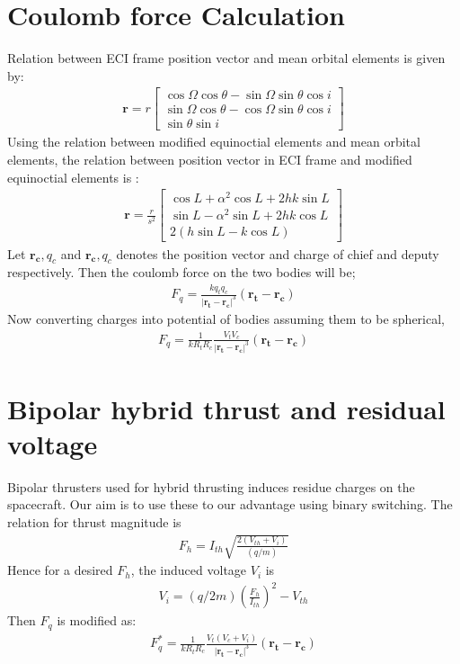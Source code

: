\documentclass[]{article}
\theoremstyle{remark}
\theoremstyle{definition}
\begin{document}
	\section{Coulomb force Calculation}
	Relation between ECI frame position vector and mean orbital elements is given by:
	\begin{align}
		\mathbf{r} = r\begin{bmatrix}
			\cos{\Omega}\cos{\theta}-\sin{\Omega}\sin{\theta}\cos{i} \\ \sin{\Omega}\cos{\theta}-\cos{\Omega}\sin{\theta}\cos{i} \\ \sin{\theta}\sin{i}
		\end{bmatrix} 
	\end{align}
	Using the relation between modified equinoctial elements and mean orbital elements, the relation between position vector in ECI frame and modified equinoctial elements is :
	\begin{align}
		\mathbf{r} = \frac{r}{s^2}\begin{bmatrix}
			\cos{L}+\alpha^2\cos{L}+2hk\sin{L} \\ \sin{L}- \alpha^2\sin{L}+2hk\cos{L} \\ 2(h\sin{L}-k\cos{L})
		\end{bmatrix}  
	\end{align}
	Let $\mathbf{r_c},q_c$ and $\mathbf{r_c},q_c$ denotes the position vector and charge of chief and deputy respectively. Then the coulomb force on the two bodies will be;
	\begin{align}
		F_q = \frac{kq_t q_c}{| \mathbf{r_t-r_c}|^3}(\mathbf{r_t-r_c})
	\end{align}
	Now converting charges into potential of bodies assuming them to be spherical,
	\begin{align}
		F_q = \frac{1}{kR_t R_c}\frac{V_t V_c}{| \mathbf{r_t-r_c}|^3}(\mathbf{r_t-r_c})
	\end{align}
	\section{Bipolar hybrid thrust and residual voltage}
	Bipolar thrusters used for hybrid thrusting induces residue charges on the spacecraft. Our aim is to use these to our advantage using binary switching.
	The relation for thrust magnitude is 
	\begin{align}
		F_h = I_{th}\sqrt{\frac{2(V_{th}+V_i)}{(q/m)}} 
	\end{align}
	Hence for a desired $F_h$, the induced voltage $V_i$ is
	\begin{align}
		V_i = (q/2m)\left(\frac{F_h}{I_{th}}\right)^2 - V_{th}
	\end{align}
	Then $F_q$ is modified as:
	\begin{align}
		F_q^* = \frac{1}{kR_t R_c}\frac{V_t (V_c+V_i)}{| \mathbf{r_t-r_c}|^3}(\mathbf{r_t-r_c})
	\end{align}
\end{document}

